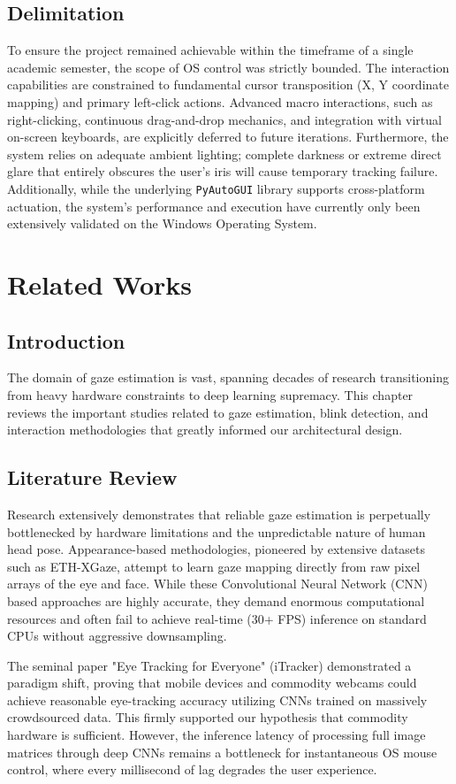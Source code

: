 \documentclass[12pt,a4paper]{report}
\begin{document}
\section{Delimitation}
To ensure the project remained achievable within the timeframe of a single academic semester, the scope of OS control was strictly bounded. The interaction capabilities are constrained to fundamental cursor transposition (X, Y coordinate mapping) and primary left-click actions. Advanced macro interactions, such as right-clicking, continuous drag-and-drop mechanics, and integration with virtual on-screen keyboards, are explicitly deferred to future iterations. Furthermore, the system relies on adequate ambient lighting; complete darkness or extreme direct glare that entirely obscures the user's iris will cause temporary tracking failure. Additionally, while the underlying \texttt{PyAutoGUI} library supports cross-platform actuation, the system's performance and execution have currently only been extensively validated on the Windows Operating System.

\chapter{Related Works}
\section{Introduction}
The domain of gaze estimation is vast, spanning decades of research transitioning from heavy hardware constraints to deep learning supremacy. This chapter reviews the important studies related to gaze estimation, blink detection, and interaction methodologies that greatly informed our architectural design.

\section{Literature Review}
Research extensively demonstrates that reliable gaze estimation is perpetually bottlenecked by hardware limitations and the unpredictable nature of human head pose. Appearance-based methodologies, pioneered by extensive datasets such as ETH-XGaze, attempt to learn gaze mapping directly from raw pixel arrays of the eye and face. While these Convolutional Neural Network (CNN) based approaches are highly accurate, they demand enormous computational resources and often fail to achieve real-time (30+ FPS) inference on standard CPUs without aggressive downsampling.

The seminal paper "Eye Tracking for Everyone" (iTracker) demonstrated a paradigm shift, proving that mobile devices and commodity webcams could achieve reasonable eye-tracking accuracy utilizing CNNs trained on massively crowdsourced data. This firmly supported our hypothesis that commodity hardware is sufficient. However, the inference latency of processing full image matrices through deep CNNs remains a bottleneck for instantaneous OS mouse control, where every millisecond of lag degrades the user experience.
\end{document}
